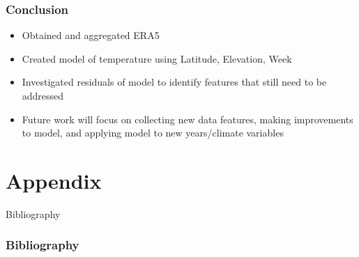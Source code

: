 \documentclass{beamer}
\begin{document}
    \begin{frame}
        \frametitle{Conclusion}
            \begin{itemize}
                \item Obtained and aggregated ERA5 
                \item Created model of temperature using Latitude, Elevation, Week
                \item Investigated residuals of model to identify features that still need to be addressed
                \item Future work will focus on collecting new data features, making improvements to model, and applying model to new years/climate variables
            \end{itemize}
    \end{frame}   


\section{Appendix}
    \begin{frame}{Bibliography}
        \frametitle{Bibliography}

        \printbibliography

    \end{frame}
\end{document}
